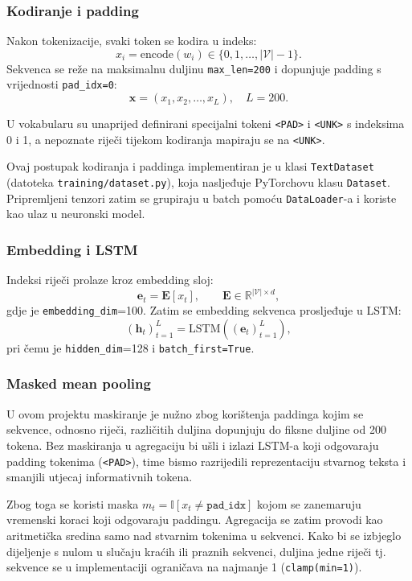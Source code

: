\documentclass[12pt,a4paper]{article}
\begin{document}
\subsubsection{Kodiranje i padding}
Nakon tokenizacije, svaki token se kodira u indeks:
\[
x_i=\mathrm{encode}(w_i)\in\{0,1,\ldots,|\mathcal{V}|-1\}.
\]
Sekvenca se reže na maksimalnu duljinu \texttt{max\_len=200} i dopunjuje padding s vrijednosti
\texttt{pad\_idx=0}:
\[
\mathbf{x}=(x_1,x_2,\ldots,x_L),\quad L=200.
\]

U vokabularu su unaprijed definirani specijalni tokeni \texttt{<PAD>} i \texttt{<UNK>} s indeksima
0 i 1, a nepoznate riječi tijekom kodiranja mapiraju se na \texttt{<UNK>}.

Ovaj postupak kodiranja i paddinga implementiran je u klasi
\texttt{TextDataset} (datoteka \texttt{training/dataset.py}), koja nasljeđuje
PyTorchovu klasu \texttt{Dataset}. Pripremljeni tenzori zatim se grupiraju u
batch pomoću \texttt{DataLoader}-a i koriste kao ulaz u neuronski model.



\subsubsection{Embedding i LSTM}
Indeksi riječi prolaze kroz embedding sloj:
\[
\mathbf{e}_t=\mathbf{E}[x_t],\qquad \mathbf{E}\in\mathbb{R}^{|\mathcal{V}|\times d},
\]
gdje je \texttt{embedding\_dim}=100. Zatim se embedding sekvenca prosljeđuje u LSTM:
\[
(\mathbf{h}_t)_{t=1}^{L}=\mathrm{LSTM}((\mathbf{e}_t)_{t=1}^{L}),
\]
pri čemu je \texttt{hidden\_dim}=128 i \texttt{batch\_first=True}.

\subsubsection{Masked mean pooling}
U ovom projektu maskiranje je nužno zbog korištenja paddinga kojim se sekvence, odnosno riječi,
različitih duljina dopunjuju do fiksne duljine od 200 tokena. Bez maskiranja u agregaciju bi ušli i izlazi LSTM-a koji odgovaraju padding
tokenima (\texttt{<PAD>}), time bismo razrijedili reprezentaciju stvarnog teksta
i smanjili utjecaj informativnih tokena.


Zbog toga se koristi maska $m_t = \mathbb{I}[x_t \neq \texttt{pad\_idx}]$ kojom se
zanemaruju vremenski koraci koji odgovaraju paddingu. Agregacija se zatim provodi
kao aritmetička sredina samo nad stvarnim tokenima u sekvenci. Kako bi se izbjeglo
dijeljenje s nulom u slučaju kraćih ili praznih sekvenci, duljina jedne riječi tj. sekvence se u
implementaciji ograničava na najmanje 1 (\texttt{clamp(min=1)}).
\end{document}
